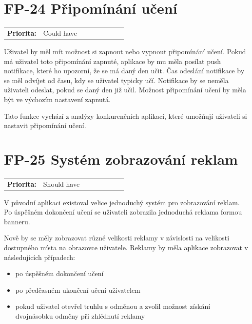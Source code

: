 \section{FP-24 Připomínání učení}\label{sec:fp-learning-reminder}

\begin{tabular}{lp{0.7\linewidth}}
    \textbf{Priorita:} & Could have \\
\end{tabular}

Uživatel by měl mít možnost si zapnout nebo vypnout připomínání učení. Pokud má uživatel toto připomínání zapnuté, aplikace by mu měla posílat push notifikace, které ho upozorní, že se má daný den učit. Čas odeslání notifikace by se měl odvíjet od času, kdy se uživatel typicky učí. Notifikace by se neměla uživateli odeslat, pokud se daný den již učil. Možnost připomínání učení by měla být ve výchozím nastavení zapnutá.

Tato funkce vychází z analýzy konkurenčních aplikací, které umožňují uživateli si nastavit připomínání učení.

\section{FP-25 Systém zobrazování reklam}\label{sec:fp-advertisement}

\begin{tabular}{lp{0.7\linewidth}}
    \textbf{Priorita:} & Should have \\
\end{tabular}

V původní aplikaci existoval velice jednoduchý systém pro zobrazování reklam. Po úspěšném dokončení učení se uživateli zobrazila jednoduchá reklama formou banneru.

Nově by se měly zobrazovat různé velikosti reklamy v závislosti na velikosti dostupného místa na obrazovce uživatele. Reklamy by měla aplikace zobrazovat v následujících případech:

\begin{itemize}
    \item po úspěšném dokončení učení
    \item po předčasném ukončení učení uživatelem
    \item pokud uživatel otevřel truhlu s odměnou a zvolil možnost získání dvojnásobku odměny při zhlédnutí reklamy
\end{itemize}

